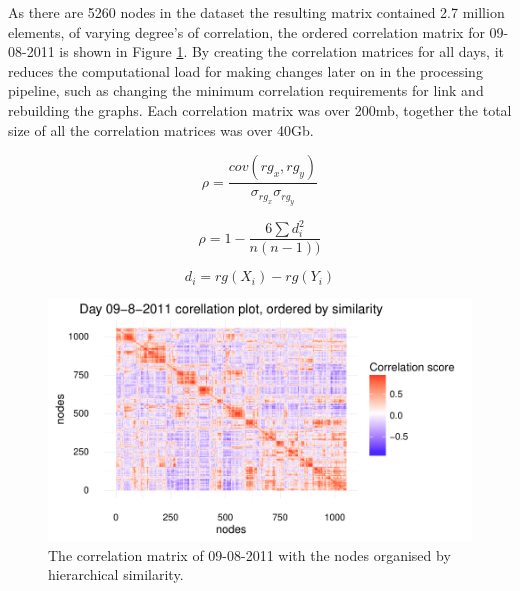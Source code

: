 As there are 5260 nodes in the dataset the resulting matrix contained 2.7 million elements, of varying degree's of correlation, the ordered correlation matrix for 09-08-2011 is shown in Figure \ref{fig:day100corplot}. By creating the correlation matrices for all days, it reduces the computational load for making changes later on in the processing pipeline, such as changing the minimum correlation requirements for link and rebuilding the graphs. Each correlation matrix was over 200mb, together the total size of all the correlation matrices was over 40Gb.

\begin{equation}
\label{eq:spearmans1}
    \rho = \frac{cov(rg_x,rg_y)}{\sigma_{rg_x}\sigma_{rg_y}}
\end{equation}

\begin{equation}
\label{eq:spearmans2}
    \rho = 1- \frac{6 \sum d_i^2}{n(n-1))}
\end{equation}

\begin{equation}
\label{eq:spearmans3}
    d_i = rg(X_i)-rg(Y_i)
\end{equation}

\begin{figure}
    \centering
    \includegraphics[width=\textwidth]{Figures/Results/day100Corplot}
    \caption[Example corellation matrix]{The correlation matrix of 09-08-2011 with the nodes organised by hierarchical similarity.}
    \label{fig:day100corplot}
\end{figure}



